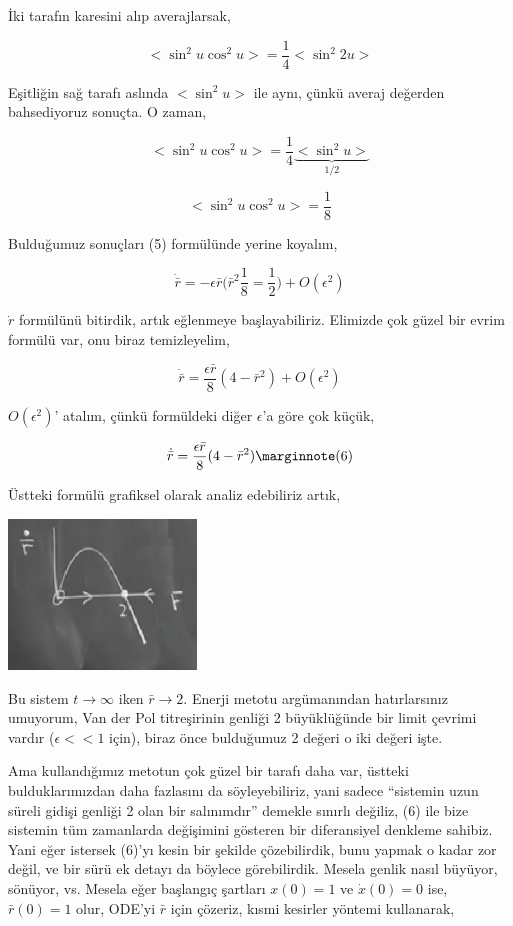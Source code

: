 \documentclass[12pt,fleqn]{article}\usepackage{../../common}
\begin{document}
İki tarafın karesini alıp averajlarsak,

$$ < \sin^2 u \cos^2 u > = \frac{1}{4} <\sin^2 2u> $$

Eşitliğin sağ tarafı aslında $< \sin^2 u>$ ile aynı, çünkü averaj değerden
bahsediyoruz sonuçta. O zaman,

$$ < \sin^2 u \cos^2 u > = \frac{1}{4} \underbrace{<\sin^2 u>}_{1/2} $$

$$ < \sin^2 u \cos^2 u > = \frac{1}{8} $$

Bulduğumuz sonuçları (5) formülünde yerine koyalım,

$$
\dot{\bar{r}} =
-\epsilon \bar{r} \big( \bar{r}^2 \frac{1}{8} = \frac{1}{2} \big) + O(\epsilon^2)
$$

$\dot{r}$ formülünü bitirdik, artık eğlenmeye başlayabiliriz. Elimizde çok güzel
bir evrim formülü var, onu biraz temizleyelim,

$$ \dot{\bar{r}} = \frac{\epsilon \bar{r}}{8} (4-\bar{r}^2) + O(\epsilon^2) $$

$O(\epsilon^2)$' atalım, çünkü formüldeki diğer $\epsilon$'a göre çok küçük, 

$$ \dot{\bar{r}} = \frac{\epsilon \bar{r}}{8} (4-\bar{r}^2)
\mlabel{6}
$$

Üstteki formülü grafiksel olarak analiz edebiliriz artık,

\includegraphics[height=4cm]{11_06.png}

Bu sistem $t \to \infty$ iken $\bar{r} \to 2$. Enerji metotu argümanından
hatırlarsınız umuyorum, Van der Pol titreşirinin genliği 2 büyüklüğünde bir
limit çevrimi vardır ($\epsilon << 1$ için), biraz önce bulduğumuz 2 değeri o
iki değeri işte.

Ama kullandığımız metotun çok güzel bir tarafı daha var, üstteki
bulduklarımızdan daha fazlasını da söyleyebiliriz, yani sadece ``sistemin uzun
süreli gidişi genliği 2 olan bir salınımdır'' demekle sınırlı değiliz, (6) ile
bize sistemin tüm zamanlarda değişimini gösteren bir diferansiyel denkleme
sahibiz. Yani eğer istersek (6)'yı kesin bir şekilde çözebilirdik, bunu yapmak o
kadar zor değil, ve bir sürü ek detayı da böylece görebilirdik. Mesela genlik
nasıl büyüyor, sönüyor, vs. Mesela eğer başlangıç şartları $x(0) = 1$ ve
$\dot{x}(0) = 0$ ise, $\bar{r}(0) = 1$ olur, ODE'yi $\bar{r}$ için çözeriz,
kısmi kesirler yöntemi kullanarak,
\end{document}
